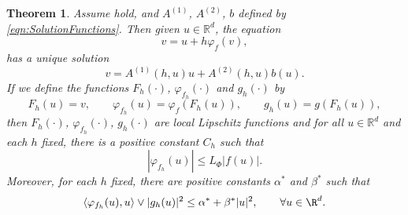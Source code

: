 \documentclass[sort&compress, preprint]{elsarticle}
\theoremstyle{definition}
\theoremstyle{plain}%
\newtheorem{thm}{Theorem}[section]
\theoremstyle{remark}
\newcommand{\innerprod}[2]{\left\langle#1, #2\right\rangle}
\begin{document}
\begin{thm}\label{lem:PhiFhProp}
	Assume  hold, and $A^{(1)}$, $A^{(2)}$, $b$  
	defined by 
	\eqref{eqn:SolutionFunctions}. Then given $u\in\mathbb{R}^d$, the equation
	\begin{equation}\label{eqn:varphiEquation}
		v = u + h \varphi_f(v),
	\end{equation}
	has a unique solution 
	\begin{equation}\label{eqn:varphiEqnSolution}
		v = A^{(1)}(h,u)u +A^{(2)}(h,u) b(u)	.
	\end{equation}
%
	If we define the functions
	$F_h(\cdot)$, $\varphi_{f_h}(\cdot)$ and $g_h(\cdot)$ by
	\begin{equation}\label{eqn:FunctionshDefinition}
		F_h(u) = v,
			\qquad 
			\varphi_{f_h}(u) =\varphi_{f}(F_h(u)),
			\qquad
			g_h(u) = g(F_h(u)),
	\end{equation}
	then $F_h(\cdot)$, $\varphi_{f_h}(\cdot)$, $g_h(\cdot)$ are local Lipschitz functions 
	and for all $u\in \mathbb{R}^d$ and each $h$ fixed, there is a positive constant $C_h$ such that
	\begin{equation}\label{eqn:PhifhFbound}
		|\varphi_{f_h}(u)|\leq L_{\Phi} |f(u)|. 
	\end{equation} 
	Moreover, for each $h$ fixed,
	 there are positive constants $\alpha^*$ and  $\beta^*$ such that
	\begin{equation}\label{eqn:h-MonotoneCondition}
		\innerprod{\varphi_{f_h}(u)}{u} \vee |g_h(u)|^2 \leq \alpha^* + \beta^* |u|^2, 
		\qquad
		\forall u \in \R^d.
	\end{equation}
\end{thm}
%
\end{document}
